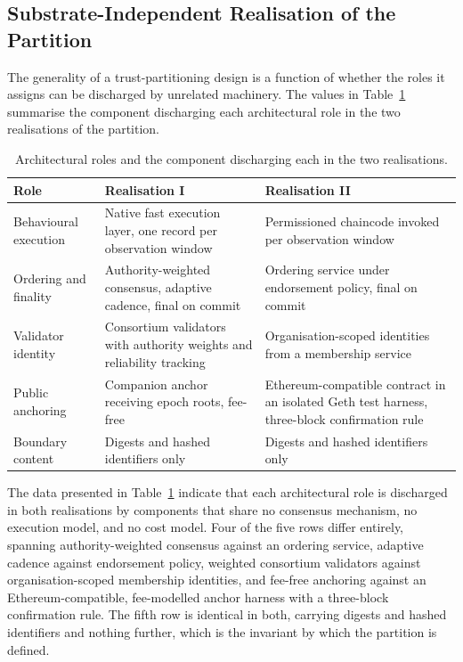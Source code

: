 \subsection{Substrate-Independent Realisation of the Partition}
\label{sec:eval-substrate}
The generality of a trust-partitioning design is a function of whether the roles it assigns can be discharged by unrelated machinery. The values in Table~\ref{tab:sub-mapping} summarise the component discharging each architectural role in the two realisations of the partition.
\begin{table}[!htbp]
  \centering
  \footnotesize
  \setlength{\tabcolsep}{5pt}
  \renewcommand{\arraystretch}{1.3}
  \caption{Architectural roles and the component discharging each in the two realisations.}
  \label{tab:sub-mapping}
  \begin{tabularx}{\textwidth}{@{}
      >{\raggedright\arraybackslash}p{3.0cm}
      >{\raggedright\arraybackslash}X
      >{\raggedright\arraybackslash}X@{}}
    \toprule
    \textbf{Role} & \textbf{Realisation I} & \textbf{Realisation II} \\
    \midrule
    Behavioural execution
      & Native fast execution layer, one record per observation window
      & Permissioned chaincode invoked per observation window \\
    Ordering and finality
      & Authority-weighted consensus, adaptive cadence, final on commit
      & Ordering service under endorsement policy, final on commit \\
    Validator identity
      & Consortium validators with authority weights and reliability tracking
      & Organisation-scoped identities from a membership service \\
    Public anchoring
      & Companion anchor receiving epoch roots, fee-free
      & Ethereum-compatible contract in an isolated Geth test harness, three-block confirmation rule \\
    Boundary content
      & Digests and hashed identifiers only
      & Digests and hashed identifiers only \\
    \bottomrule
  \end{tabularx}
\end{table}
The data presented in Table~\ref{tab:sub-mapping} indicate that each architectural role is discharged in both realisations by components that share no consensus mechanism, no execution model, and no cost model. Four of the five rows differ entirely, spanning authority-weighted consensus against an ordering service, adaptive cadence against endorsement policy, weighted consortium validators against organisation-scoped membership identities, and fee-free anchoring against an Ethereum-compatible, fee-modelled anchor harness with a three-block confirmation rule. The fifth row is identical in both, carrying digests and hashed identifiers and nothing further, which is the invariant by which the partition is defined.

